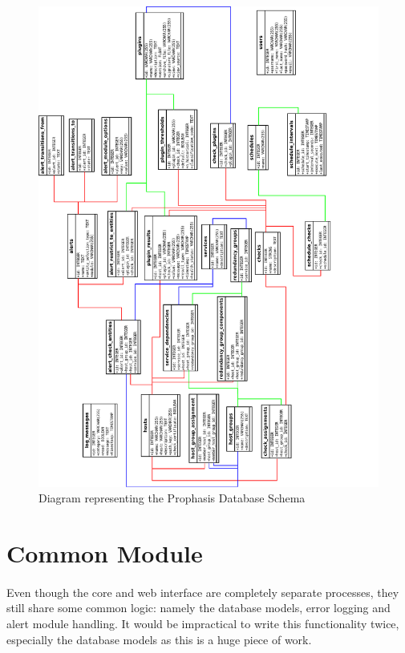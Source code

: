 \documentclass[bsc,logo,twoside,singlespacing,notimes]{infthesis}
\begin{document}
\begin{figure}[H]
	\caption{Diagram representing the Prophasis Database Schema}
	\label{database-diagram}
	\includegraphics[scale=0.84]{assets/schema.pdf}
\end{figure}

\section{Common Module}
\paragraph*{}
	Even though the core and web interface are completely separate processes, they
	still share some common logic: namely the database models, error logging and
	alert module handling.  It would be impractical to write this functionality
	twice, especially the database models as this is a huge piece of work.
	
\end{document}
